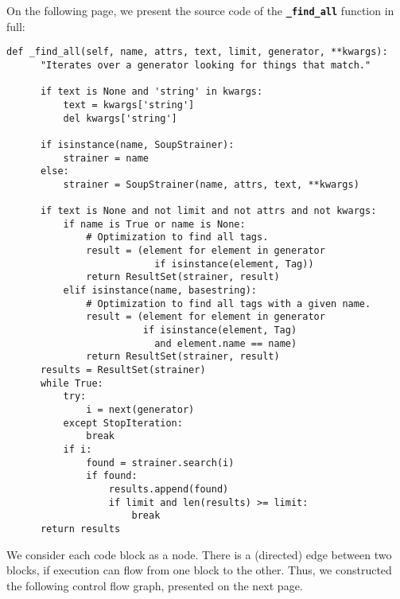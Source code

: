 \documentclass[10pt]{article}
\newcommand{\tbt}[1]{\texttt{\textbf{#1}}}
\begin{document}
On the following page, we present the source code of the \tbt{\_find\_all} function in full: 
\newpage
\begin{lstlisting}[style = pythonstyle-small]
def _find_all(self, name, attrs, text, limit, generator, **kwargs):
      "Iterates over a generator looking for things that match."

      if text is None and 'string' in kwargs:
          text = kwargs['string']
          del kwargs['string']

      if isinstance(name, SoupStrainer):
          strainer = name
      else:
          strainer = SoupStrainer(name, attrs, text, **kwargs)

      if text is None and not limit and not attrs and not kwargs:
          if name is True or name is None:
              # Optimization to find all tags.
              result = (element for element in generator
                          if isinstance(element, Tag))
              return ResultSet(strainer, result)
          elif isinstance(name, basestring):
              # Optimization to find all tags with a given name.
              result = (element for element in generator
                        if isinstance(element, Tag)
                          and element.name == name)
              return ResultSet(strainer, result)
      results = ResultSet(strainer)
      while True:
          try:
              i = next(generator)
          except StopIteration:
              break
          if i:
              found = strainer.search(i)
              if found:
                  results.append(found)
                  if limit and len(results) >= limit:
                      break
      return results
\end{lstlisting}

We consider each code block as a node. There is a (directed) edge between two blocks, if execution can flow from one block to the other. Thus, we constructed the following control flow graph, presented on the next page.
\end{document}
